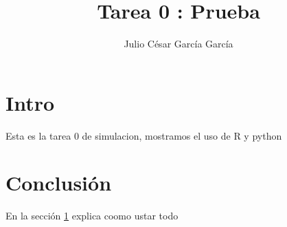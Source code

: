 \documentclass{article}
\title{Tarea 0 : Prueba}
\author{Julio César García García}
\begin{document}
	
\maketitle


	\section{Intro}\label{intro}
	 Esta es la tarea 0 de simulacion, mostramos el uso de R y python
	 
	 \section{Conclusión}
	 En la sección \ref{intro} explica coomo ustar todo
	
	
\end{document}
